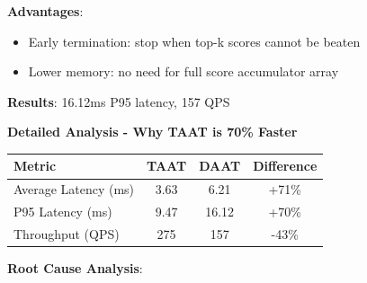 \documentclass[12pt,a4paper]{article}
\begin{document}
\textbf{Advantages}:
\begin{itemize}
    \item Early termination: stop when top-k scores cannot be beaten
    \item Lower memory: no need for full score accumulator array
\end{itemize}

\textbf{Results}: 16.12ms P95 latency, 157 QPS

\textbf{Detailed Analysis - Why TAAT is 70\% Faster}

\begin{table}[H]
\centering
\begin{tabular}{lccc}
\toprule
\textbf{Metric} & \textbf{TAAT} & \textbf{DAAT} & \textbf{Difference} \\
\midrule
Average Latency (ms) & 3.63 & 6.21 & +71\% \\
P95 Latency (ms) & 9.47 & 16.12 & +70\% \\
Throughput (QPS) & 275 & 157 & -43\% \\
\bottomrule
\end{tabular}
\end{table}

\textbf{Root Cause Analysis}:
\end{document}
